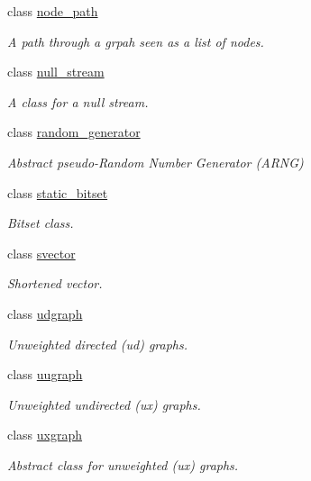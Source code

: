 \begin{DoxyCompactItemize}
class \hyperlink{classlgraph_1_1utils_1_1node__path}{node\+\_\+path}
\begin{DoxyCompactList}\small\item\em A path through a grpah seen as a list of nodes. \end{DoxyCompactList}\item 
class \hyperlink{classlgraph_1_1utils_1_1null__stream}{null\+\_\+stream}
\begin{DoxyCompactList}\small\item\em A class for a null stream. \end{DoxyCompactList}\item 
class \hyperlink{classlgraph_1_1utils_1_1random__generator}{random\+\_\+generator}
\begin{DoxyCompactList}\small\item\em Abstract pseudo-\/\+Random Number Generator (A\+R\+NG) \end{DoxyCompactList}\item 
class \hyperlink{classlgraph_1_1utils_1_1static__bitset}{static\+\_\+bitset}
\begin{DoxyCompactList}\small\item\em Bitset class. \end{DoxyCompactList}\item 
class \hyperlink{classlgraph_1_1utils_1_1svector}{svector}
\begin{DoxyCompactList}\small\item\em Shortened vector. \end{DoxyCompactList}\item 
class \hyperlink{classlgraph_1_1utils_1_1udgraph}{udgraph}
\begin{DoxyCompactList}\small\item\em Unweighted directed (ud) graphs. \end{DoxyCompactList}\item 
class \hyperlink{classlgraph_1_1utils_1_1uugraph}{uugraph}
\begin{DoxyCompactList}\small\item\em Unweighted undirected (ux) graphs. \end{DoxyCompactList}\item 
class \hyperlink{classlgraph_1_1utils_1_1uxgraph}{uxgraph}
\begin{DoxyCompactList}\small\item\em Abstract class for unweighted (ux) graphs. \end{DoxyCompactList}\item 

\end{DoxyCompactItemize}
